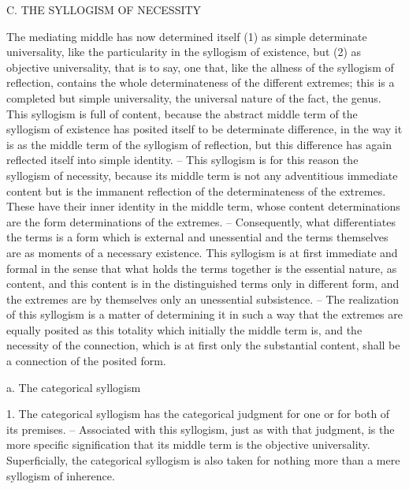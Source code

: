 C. THE SYLLOGISM OF NECESSITY

The mediating middle has now determined itself (1) as simple determinate
universality, like the particularity in the syllogism of existence, but (2) as
objective universality, that is to say, one that, like the allness of the syllogism
of reflection, contains the whole determinateness of the different extremes;
this is a completed but simple universality, the universal nature of the fact,
the genus.
This syllogism is full of content, because the abstract middle term of
the syllogism of existence has posited itself to be determinate difference, in
the way it is as the middle term of the syllogism of reflection, but this
difference has again reflected itself into simple identity. – This syllogism
is for this reason the syllogism of necessity, because its middle term is not
any adventitious immediate content but is the immanent reflection of the
determinateness of the extremes. These have their inner identity in the
middle term, whose content determinations are the form determinations
of the extremes. – Consequently, what differentiates the terms is a form
which is external and unessential and the terms themselves are as moments
of a necessary existence.
This syllogism is at first immediate and formal in the sense that what
holds the terms together is the essential nature, as content, and this content
is in the distinguished terms only in different form, and the extremes are
by themselves only an unessential subsistence. – The realization of this
syllogism is a matter of determining it in such a way that the extremes are
equally posited as this totality which initially the middle term is, and the
necessity of the connection, which is at first only the substantial content,
shall be a connection of the posited form.

a. The categorical syllogism

1. The categorical syllogism has the categorical judgment for one or for
both of its premises. – Associated with this syllogism, just as with that
judgment, is the more specific signification that its middle term is the
objective universality. Superficially, the categorical syllogism is also taken
for nothing more than a mere syllogism of inherence.

